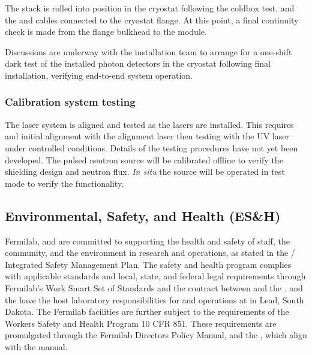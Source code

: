 The  stack is rolled into position in the cryostat following the coldbox test, and the  and  cables connected to the cryostat flange.  At this point, a final continuity check is made from the flange bulkhead to the  module.

Discussions are underway with the installation team to arrange for a one-shift dark test of the installed photon detectors in the cryostat following final installation, verifying end-to-end system operation.

\subsubsection{Calibration system testing}
The laser system is aligned and tested as the lasers are installed. This requires and initial alignment with the alignment laser then testing with the UV laser under controlled conditions. Details of the testing procedures have not yet been developed. The pulsed neutron source will be calibrated offline to verify the shielding design and neutron flux. {\it In situ} the source will be operated in test mode to verify the functionality. 

\subsection{Environmental, Safety, and Health (ES\&H)}
\label{sec:fdsp-tc-inst-safety}

Fermilab,   and  are committed to supporting the health and safety of staff, the community, and the environment in research and operations, as stated in the / Integrated Safety Management Plan\cite{bib:docdb291}. The safety and health program complies with applicable standards and local, state, and federal legal requirements through Fermilab's Work Smart Set of Standards  and the contract between  and the .  and the  have the host laboratory responsibilities for  and  operations at  in Lead, South Dakota.
The Fermilab facilities are further subject to the requirements of the  Workers Safety and Health Program 10 CFR 851\cite{doe-10cfr851}. These requirements are promulgated through the Fermilab Directors Policy Manual, and the , which align with the   manual.

